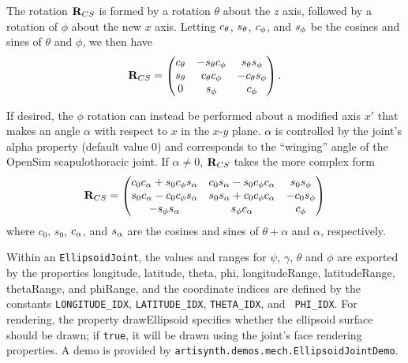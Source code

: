 The rotation ${\bf R}_{CS}$ is formed by a rotation $\theta$ about the $z$
axis, followed by a rotation of $\phi$ about the new $x$ axis.
Letting $c_\theta$, $s_\theta$, $c_\phi$, and $s_\phi$ be the cosines and sines of
$\theta$ and $\phi$, we then have
%
\begin{equation*}
{\bf R}_{CS} = \left(\begin{matrix} 
c_\theta & -s_\theta c_\phi & s_\theta s_\phi \\
s_\theta & c_\theta c_\phi & -c_\theta s_\phi \\
0 & s_\phi & c_\phi
\end{matrix}\right).
\end{equation*}
%

If desired, the $\phi$ rotation can instead be performed about a
modified axis $x'$ that makes an angle $\alpha$ with respect to $x$
in the $x$-$y$ plane. $\alpha$ is controlled by the joint's {\sf alpha}
property (default value $0$) and corresponds to the ``winging'' angle
of the OpenSim scapulothoracic joint. If $\alpha \ne 0$,
${\bf R}_{CS}$ takes the more complex form
%
\begin{equation*}
{\bf R}_{CS} = \left(\begin{matrix} 
c_0 c_{\alpha} + s_0 c_\phi s_{\alpha} & c_0 s_{\alpha} - s_0 c_\phi c_{\alpha} & s_0 s_\phi \\
s_0 c_{\alpha} - c_0 c_\phi s_{\alpha} & s_0 s_{\alpha} + c_0 c_\phi c_{\alpha} & -c_0 s_\phi\\
-s_\phi s_{\alpha} & s_\phi c_{\alpha} & c_\phi 
\end{matrix}\right)
\end{equation*}
%
where $c_0$, $s_0$, $c_{\alpha}$, and $s_{\alpha}$ are the cosines and sines of
$\theta + \alpha$ and $\alpha$, respectively.

Within an {\tt EllipsoidJoint}, the values and ranges for $\psi$,
$\gamma$, $\theta$ and $\phi$ are exported by the properties {\sf
longitude}, {\sf latitude}, {\sf theta}, {\sf phi}, {\sf
longitudeRange}, {\sf latitudeRange}, {\sf thetaRange}, and {\sf
phiRange}, and the coordinate indices are defined by the constants
{\tt LONGITUDE\_IDX}, {\tt LATITUDE\_IDX}, {\tt THETA\_IDX}, and {\tt
PHI\_IDX}.  For rendering, the property {\sf drawEllipsoid} specifies
whether the ellipsoid surface should be drawn; if {\tt true}, it will
be drawn using the joint's face rendering properties.  A demo is
provided by {\tt artisynth.demos.mech.EllipsoidJointDemo}.

